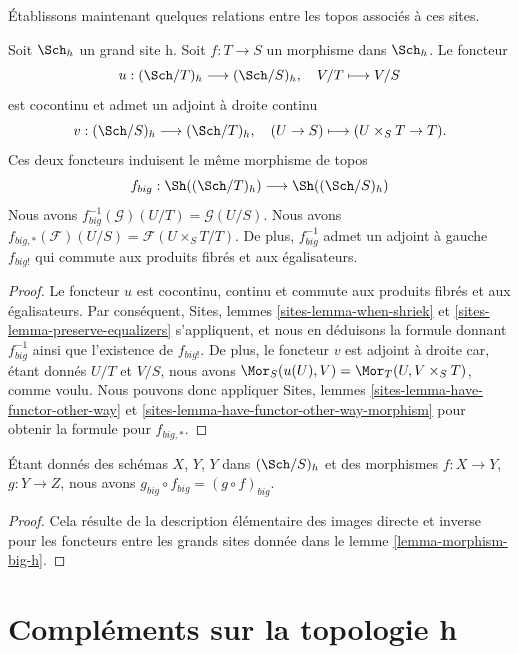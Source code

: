 \noindent
Établissons maintenant quelques relations entre les topos
associés à ces sites.

\begin{lemma}
\label{lemma-morphism-big-h}
Soit $\Sch_h$ un grand site h.
Soit $f : T \to S$ un morphisme dans $\Sch_h$.
Le foncteur
$$
u : (\Sch/T)_h \longrightarrow (\Sch/S)_h,
\quad
V/T \longmapsto V/S
$$
est cocontinu et admet un adjoint à droite continu
$$
v : (\Sch/S)_h \longrightarrow (\Sch/T)_h,
\quad
(U \to S) \longmapsto (U \times_S T \to T).
$$
Ces deux foncteurs induisent le même morphisme de topos
$$
f_{big} :
\Sh((\Sch/T)_h)
\longrightarrow
\Sh((\Sch/S)_h)
$$
Nous avons $f_{big}^{-1}(\mathcal{G})(U/T) = \mathcal{G}(U/S)$.
Nous avons $f_{big, *}(\mathcal{F})(U/S) = \mathcal{F}(U \times_S T/T)$.
De plus, $f_{big}^{-1}$ admet un adjoint à gauche $f_{big!}$ qui commute aux
produits fibrés et aux égalisateurs.
\end{lemma}

\begin{proof}
Le foncteur $u$ est cocontinu, continu et commute aux produits fibrés
et aux égalisateurs. Par conséquent,
Sites, lemmes \ref{sites-lemma-when-shriek} et
\ref{sites-lemma-preserve-equalizers}
s'appliquent, et nous en déduisons la formule
donnant $f_{big}^{-1}$ ainsi que l'existence de $f_{big!}$. De plus,
le foncteur $v$ est adjoint à droite car, étant donnés $U/T$ et $V/S$,
nous avons $\Mor_S(u(U), V) = \Mor_T(U, V \times_S T)$,
comme voulu. Nous pouvons donc appliquer
Sites, lemmes \ref{sites-lemma-have-functor-other-way} et
\ref{sites-lemma-have-functor-other-way-morphism} pour obtenir la
formule pour $f_{big, *}$.
\end{proof}

\begin{lemma}
\label{lemma-composition-h}
Étant donnés des schémas $X$, $Y$, $Y$ dans $(\Sch/S)_h$
et des morphismes $f : X \to Y$, $g : Y \to Z$, nous avons
$g_{big} \circ f_{big} = (g \circ f)_{big}$.
\end{lemma}

\begin{proof}
Cela résulte de la description élémentaire des images directe
et inverse pour les foncteurs entre les grands sites donnée dans le
lemme \ref{lemma-morphism-big-h}.
\end{proof}










\section{Compléments sur la topologie h}
\label{section-h-more}

